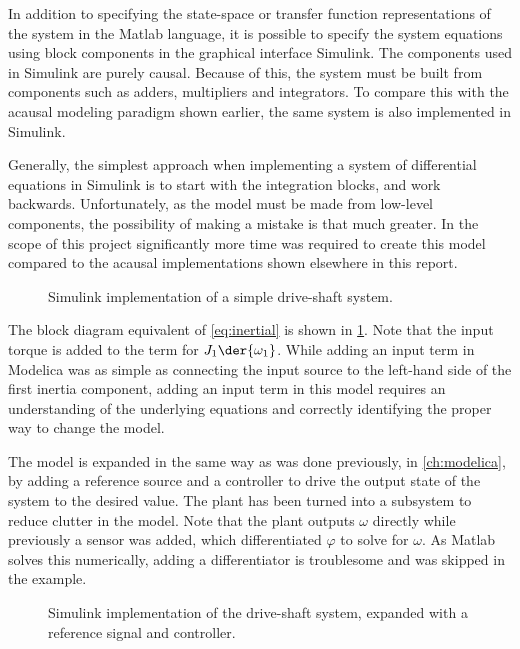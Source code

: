 \documentclass[\rootfolder/main.tex]{subfiles}
\begin{document}
In addition to specifying the state-space or transfer function representations of the system in the Matlab language, it is possible to specify
the system equations using block components in the graphical interface Simulink.
The components used in Simulink are purely causal.
Because of this, the system must be built from components such as adders, multipliers and integrators.
To compare this with the acausal modeling paradigm shown earlier, the same system is also implemented in Simulink.

Generally, the simplest approach when implementing a system of differential equations in Simulink is to start with the integration blocks, and work backwards.
Unfortunately, as the model must be made from low-level components, the possibility of making a mistake is that much greater.
In the scope of this project significantly more time was required to create this model compared to the acausal implementations shown elsewhere in this report.

\begin{figure}[ht]
    \caption{Simulink implementation of a simple drive-shaft system.\label{fig:simulink-inertial}}
\end{figure}

The block diagram equivalent of \cref{eq:inertial} is shown in \cref{fig:simulink-inertial}.
Note that the input torque is added to the term for $J_{1} \der{\omega_{1}}$.
While adding an input term in Modelica was as simple as connecting the input source to the left-hand side of the first inertia component,
adding an input term in this model requires an understanding of the underlying equations and correctly identifying the proper way to change the model.

The model is expanded in the same way as was done previously, in \cref{ch:modelica}, by adding a reference source and a controller to drive the output state of the system to the desired value.
The plant has been turned into a subsystem to reduce clutter in the model.
Note that the plant outputs $\omega$ directly while previously a sensor was added, which differentiated $\varphi$ to solve for $\omega$.
As Matlab solves this numerically, adding a differentiator is troublesome and was skipped in the example.

\begin{wrapfigure}{R}{0.5\columnwidth}
    \caption{Simulink implementation of the drive-shaft system, expanded with a reference signal and controller.\label{fig:simulink-inertial-expanded}}
\end{wrapfigure}
\end{document}
